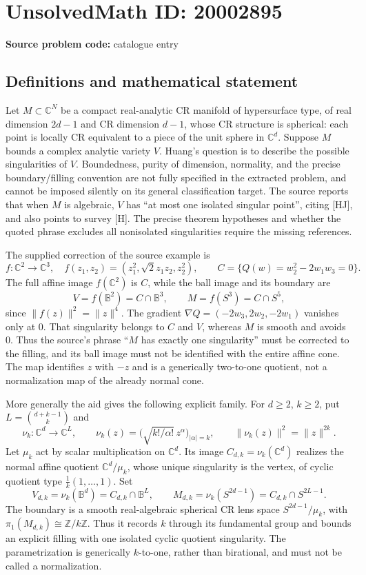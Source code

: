 \documentclass[11pt]{article}
\newcommand{\Z}{\mathbb{Z}}
\newcommand{\C}{\mathbb{C}}
\begin{document}
\section*{UnsolvedMath ID: 20002895}
\textbf{Source problem code:} catalogue entry
\subsection{Definitions and mathematical statement}
Let $M\subset\C^N$ be a compact real-analytic CR manifold of hypersurface type, of real dimension $2d-1$ and CR dimension $d-1$, whose CR structure is spherical: each point is locally CR equivalent to a piece of the unit sphere in $\C^d$. Suppose $M$ bounds a complex analytic variety $V$. Huang's question is to describe the possible singularities of $V$. Boundedness, purity of dimension, normality, and the precise boundary/filling convention are not fully specified in the extracted problem, and cannot be imposed silently on its general classification target. The source reports that when $M$ is algebraic, $V$ has ``at most one isolated singular point'', citing [HJ], and also points to survey [H]. The precise theorem hypotheses and whether the quoted phrase excludes all nonisolated singularities require the missing references.

The supplied correction of the source example is
\[
f:\C^2\to\C^3,\quad f(z_1,z_2)=(z_1^2,\sqrt2z_1z_2,z_2^2),\qquad
C=\{Q(w)=w_2^2-2w_1w_3=0\}.
\]
The full affine image $f(\C^2)$ is $C$, while the ball image and its boundary are
\[
V=f(\mathbb B^2)=C\cap\mathbb B^3,\qquad M=f(S^3)=C\cap S^5,
\]
since $\|f(z)\|^2=\|z\|^4$. The gradient $\nabla Q=(-2w_3,2w_2,-2w_1)$ vanishes only at $0$. That singularity belongs to $C$ and $V$, whereas $M$ is smooth and avoids $0$. Thus the source's phrase ``$M$ has exactly one singularity'' must be corrected to the filling, and its ball image must not be identified with the entire affine cone. The map identifies $z$ with $-z$ and is a generically two-to-one quotient, not a normalization map of the already normal cone.

More generally the aid gives the following explicit family. For $d\geq2$, $k\geq2$, put $L=\binom{d+k-1}{k}$ and
\[
\nu_k:\C^d\to\C^L,\qquad
\nu_k(z)=\bigl(\sqrt{k!/\alpha!}\,z^\alpha\bigr)_{|\alpha|=k},\qquad
\|\nu_k(z)\|^2=\|z\|^{2k}.
\]
Let $\mu_k$ act by scalar multiplication on $\C^d$. Its image $C_{d,k}=\nu_k(\C^d)$ realizes the normal affine quotient $\C^d/\mu_k$, whose unique singularity is the vertex, of cyclic quotient type $\frac1k(1,\ldots,1)$. Set
\[
V_{d,k}=\nu_k(\mathbb B^d)=C_{d,k}\cap\mathbb B^L,\qquad
M_{d,k}=\nu_k(S^{2d-1})=C_{d,k}\cap S^{2L-1}.
\]
The boundary is a smooth real-algebraic spherical CR lens space $S^{2d-1}/\mu_k$, with $\pi_1(M_{d,k})\cong\Z/k\Z$. Thus it records $k$ through its fundamental group and bounds an explicit filling with one isolated cyclic quotient singularity. The parametrization is generically $k$-to-one, rather than birational, and must not be called a normalization.
\end{document}
